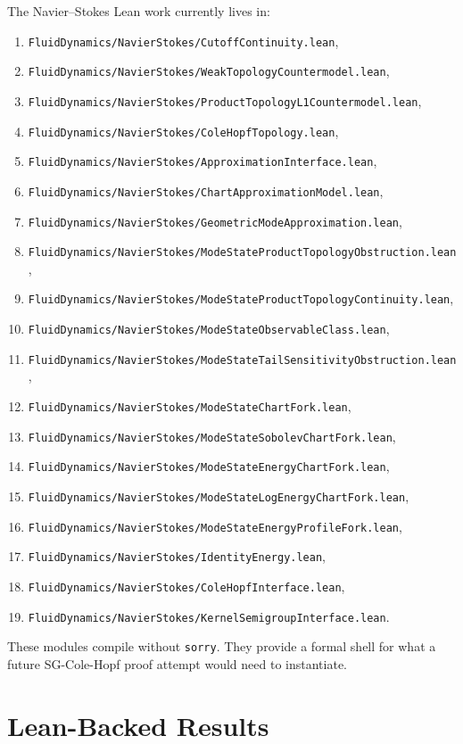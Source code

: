 \documentclass[11pt]{article}
\begin{document}
The Navier--Stokes Lean work currently lives in:
\begin{enumerate}[leftmargin=1.5em]
  \item \texttt{FluidDynamics/NavierStokes/CutoffContinuity.lean},
  \item \texttt{FluidDynamics/NavierStokes/WeakTopologyCountermodel.lean},
  \item \texttt{FluidDynamics/NavierStokes/ProductTopologyL1Countermodel.lean},
  \item \texttt{FluidDynamics/NavierStokes/ColeHopfTopology.lean},
  \item \texttt{FluidDynamics/NavierStokes/ApproximationInterface.lean},
  \item \texttt{FluidDynamics/NavierStokes/ChartApproximationModel.lean},
  \item \texttt{FluidDynamics/NavierStokes/GeometricModeApproximation.lean},
  \item \texttt{FluidDynamics/NavierStokes/ModeStateProductTopologyObstruction.lean},
  \item \texttt{FluidDynamics/NavierStokes/ModeStateProductTopologyContinuity.lean},
  \item \texttt{FluidDynamics/NavierStokes/ModeStateObservableClass.lean},
  \item \texttt{FluidDynamics/NavierStokes/ModeStateTailSensitivityObstruction.lean},
  \item \texttt{FluidDynamics/NavierStokes/ModeStateChartFork.lean},
  \item \texttt{FluidDynamics/NavierStokes/ModeStateSobolevChartFork.lean},
  \item \texttt{FluidDynamics/NavierStokes/ModeStateEnergyChartFork.lean},
  \item \texttt{FluidDynamics/NavierStokes/ModeStateLogEnergyChartFork.lean},
  \item \texttt{FluidDynamics/NavierStokes/ModeStateEnergyProfileFork.lean},
  \item \texttt{FluidDynamics/NavierStokes/IdentityEnergy.lean},
  \item \texttt{FluidDynamics/NavierStokes/ColeHopfInterface.lean},
  \item \texttt{FluidDynamics/NavierStokes/KernelSemigroupInterface.lean}.
\end{enumerate}

These modules compile without \texttt{sorry}.  They provide a formal shell for
what a future SG-Cole-Hopf proof attempt would need to instantiate.

\section{Lean-Backed Results}
\end{document}
